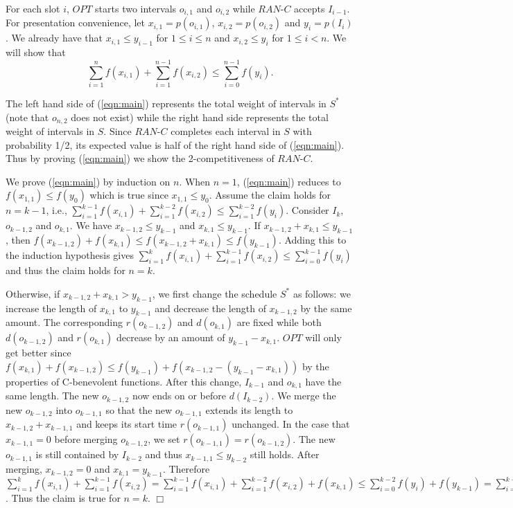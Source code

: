 \documentclass[11pt]{article}
\newcommand{\qed}{\hspace*{\fill}$\Box$\par\medskip}
\newenvironment{proof}{\noindent{\it Proof. }\ignorespaces}{\qed}
\begin{document}
\begin{proof}
For each slot $i$, $OPT$ starts two intervals $o_{i,1}$ and
$o_{i,2}$ while $RAN$-$C$ accepts $I_{i-1}$. 
For presentation convenience,
let $x_{i,1}=p(o_{i,1})$, $x_{i,2}=p(o_{i,2})$
and $y_i=p(I_i)$. 
We already have that
$x_{i,1} \leq y_{i-1}$ for $1 \leq i \leq n$ 
and $x_{i,2} \leq y_{i}$ for $1 \leq i < n$.
We will show that 
\begin{equation} \label{eqn:main}
\sum^n_{i=1} f(x_{i,1}) + \sum^{n-1}_{i=1} f(x_{i,2})
   \leq \sum^{n-1}_{i=0} f(y_i).
\end{equation}

The left hand side of (\ref{eqn:main}) represents the total weight of 
intervals in $S^*$ (note that $o_{n,2}$ does not exist)
while the right hand side represents the total weight of intervals in
$S$. 
Since $RAN$-$C$ completes each interval in $S$ with probability 1/2,
its expected value is half of the right hand side of (\ref{eqn:main}).
Thus by proving (\ref{eqn:main}) we show the 2-competitiveness
of $RAN$-$C$.

We prove (\ref{eqn:main}) by induction on $n$.
When $n=1$, (\ref{eqn:main}) reduces to $f(x_{1,1}) \le f(y_0)$ 
which is true since $x_{1,1} \le y_0$.
Assume the claim holds for $n=k-1$, i.e.,
$\sum^{k-1}_{i=1} f(x_{i,1}) + \sum^{k-2}_{i=1} f(x_{i,2}) \leq 
\sum^{k-2}_{i=1} f(y_i)$.
Consider $I_k$, $o_{k-1,2}$ and $o_{k,1}$.
We have $x_{k-1,2} \le y_{k-1}$ and $x_{k,1} \le y_{k-1}$.
If $x_{k-1,2} + x_{k,1} \leq y_{k-1}$, then 
$f(x_{k-1,2})+f(x_{k,1}) \leq f(x_{k-1,2}+x_{k,1}) \leq f(y_{k-1})$.
Adding this to the induction hypothesis gives
$\sum^{k}_{i=1} f(x_{i,1}) + \sum^{k-1}_{i=1} f(x_{i,2}) \leq 
\sum^{k-1}_{i=0} f(y_i)$
and thus the claim holds for $n=k$.

Otherwise, if $x_{k-1,2}+x_{k,1} > y_{k-1}$, we first change the schedule
$S^*$ as follows: we increase the length of
$x_{k,1}$ to $y_{k-1}$ and decrease the length of $x_{k-1,2}$ by the
same amount.  The corresponding $r(o_{k-1,2})$ and $d(o_{k,1})$ are
fixed while both $d(o_{k-1,2})$ and $r(o_{k,1})$ decrease by an amount
of $y_{k-1}-x_{k,1}$.  
$OPT$ will only get better since
$f(x_{k,1}) + f(x_{k-1,2}) \leq f(y_{k-1}) + f(x_{k-1,2}-(y_{k-1}-x_{k,1}))$
by the properties of C-benevolent functions. 
After this change, $I_{k-1}$ and $o_{k,1}$ have the same length.
The new $o_{k-1,2}$ now ends on or before $d(I_{k-2})$.
We merge the new $o_{k-1,2}$ into $o_{k-1,1}$ so that the new $o_{k-1,1}$
extends its length to $x_{k-1,2}+x_{k-1,1}$ and keeps its start time
$r(o_{k-1,1})$ unchanged.  In the case that
$x_{k-1,1}=0$ before merging $o_{k-1,2}$, we set
$r(o_{k-1,1}) = r(o_{k-1,2})$.
The new $o_{k-1,1}$ is still contained by $I_{k-2}$
and thus $x_{k-1,1} \leq y_{k-2}$ still holds.
After merging, $x_{k-1,2}=0$ and $x_{k,1}=y_{k-1}$.  
Therefore
$\sum^{k}_{i=1} f(x_{i,1}) + \sum^{k-1}_{i=1} f(x_{i,2}) 
= \sum^{k-1}_{i=1} f(x_{i,1}) + \sum^{k-2}_{i=1} f(x_{i,2}) + f(x_{k,1})
\leq \sum^{k-2}_{i=0} f(y_i) + f(y_{k-1})
= \sum^{k-1}_{i=0} f(y_i)$.
Thus the claim is true for $n=k$.  
\end{proof}
\end{document}
